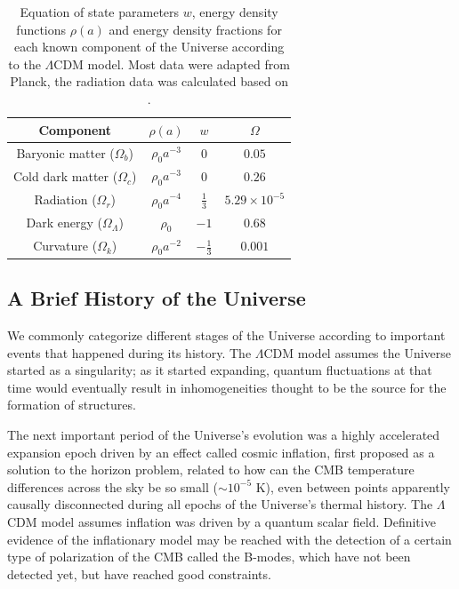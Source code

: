 \documentclass[openany,a4paper,12pt,oneside]{book}
\begin{document}
\begin{spacing}{1.5}
\begin{table}[!htb]
\centering
    \begin{tabular}{cccc} \hline
     Component & $\rho(a)$ & $w$ & $\Omega$ \\ \hline
     Baryonic matter ($\Omega_b$) & $\rho_0a^{-3}$ & $0$ & $0.05$\\
     Cold dark matter ($\Omega_c$) & $\rho_0a^{-3}$ & $0$ & $0.26$ \\
     Radiation ($\Omega_r$) & $\rho_0a^{-4}$ & $\frac{1}{3}$ & $5.29\times 10^{-5}$\\
     Dark energy ($\Omega_\Lambda$) & $\rho_0$ & $-1$ & $0.68$\\
     Curvature ($\Omega_k$) & $\rho_0 a^{-2}$ & $-\frac{1}{3}$ & $0.001$\\ \hline
    \end{tabular}
    \caption{Equation of state parameters $w$, energy density functions $\rho(a)$ and energy density fractions for each known component of the Universe according to the $\Lambda$CDM model. Most data were adapted from Planck\cite{Planck_results}, the radiation data was calculated based on \cite{lahav2014cosmological}.}
    \label{tab:rhos&Omegas}
\end{table}

\subsection{A Brief History of the Universe}

We commonly categorize different stages of the Universe according to important events that happened during its history. The $\Lambda$CDM model assumes the Universe started as a singularity; as it started expanding, quantum fluctuations at that time would eventually result in inhomogeneities thought to be the source for the formation of structures.

The next important period of the Universe's evolution was a highly accelerated expansion epoch driven by an effect called cosmic inflation, first proposed as a solution to the horizon problem\cite{Guth81,linde82}, related to how can the CMB temperature differences across the sky be so small ($\sim 10^{-5}$ K), even between points apparently causally disconnected during all epochs of the Universe's thermal history. The $\Lambda$CDM model assumes inflation was driven by a quantum scalar field\cite{dodelson2020modern}. Definitive evidence of the inflationary model may be reached with the detection of a certain type of polarization of the CMB called the B-modes, which have not been detected yet, but have reached good constraints.\cite{BMode_constraints}


\end{spacing}
\end{document}
